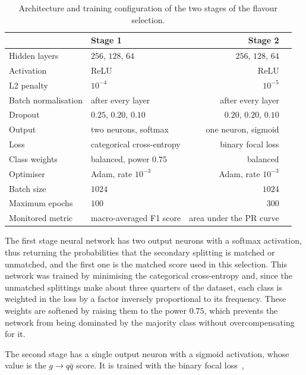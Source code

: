 \begin{table}[htbp]
  \centering
  \caption{Architecture and training configuration of the two stages of the
  flavour selection.}
  \label{tab:hyperparameters}
  \begin{tabular}{llrr}
    \toprule
    & Stage 1 & Stage 2 \\
    \midrule
    Hidden layers        & $256$, $128$, $64$         & $256$, $128$, $64$ \\
    Activation           & ReLU                       & ReLU \\
    L2 penalty           & $10^{-4}$                  & $10^{-5}$ \\
    Batch normalisation  & after every layer          & after every layer \\
    Dropout              & $0.25$, $0.20$, $0.10$     & $0.20$, $0.20$, $0.10$ \\
    Output               & two neurons, softmax       & one neuron, sigmoid \\
    Loss                 & categorical cross-entropy  & binary focal loss \\
    Class weights        & balanced, power $0.75$     & balanced \\
    Optimiser            & Adam, rate $10^{-3}$       & Adam, rate $10^{-3}$ \\
    Batch size           & $1024$                     & $1024$ \\
    Maximum epochs       & $100$                      & $300$ \\
    Monitored metric     & macro-averaged F1 score    & area under the PR curve \\
    \bottomrule
  \end{tabular}
\end{table}

The first stage neural network has two output neurons with a softmax activation, thus
returning the probabilities that the secondary splitting is matched or unmatched, and the first
one is the matched score used in this selection. This network was trained by minimising 
the categorical cross-entropy and, since the unmatched splittings make about three quarters of 
the dataset, each class is weighted in the loss by a factor inversely
proportional to its frequency. These weights are softened by raising them to the
power $0.75$, which prevents the network from being dominated by the majority
class without overcompensating for it.

The second stage has a single output neuron with a sigmoid activation, whose value
is the $g \to q\bar{q}$ score. It is trained with the binary focal
loss~\cite{Lin:2017focal},

